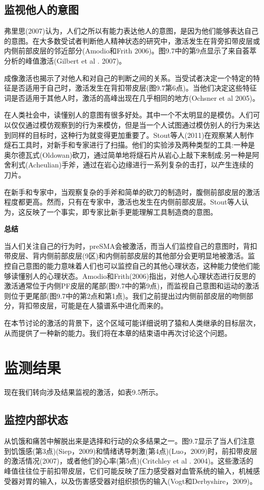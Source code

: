 \subsection{监视他人的意图}
\par
弗里思(2007)认为，人们之所以有能力表达他人的意图，是因为他们能够表达自己的意图。在大多数受试者判断他人精神状态的研究中，激活发生在背旁扣带皮层或内侧前部皮层的邻近部分(Amodio和Frith 2006)。图9.7中的第9点显示了来自荟萃分析的峰值激活(Gilbert et al . 2007)。
\par
成像激活也揭示了对他人和对自己的判断之间的关系。当受试者决定一个特定的特征是否适用于自己时，激活发生在背扣带皮层(图9.7第6点)。当他们决定这些特征词是否适用于其他人时，激活的高峰出现在几乎相同的地方(Ochsner et al 2005)。
\par
在人类社会中，读懂别人的意图有很多好处。其中一个不太明显的是模仿。人们可以仅仅通过模仿观察到的行为来模仿，但是当一个人试图通过模仿别人的行为来达到同样的目标时，这种行为就变得更加重要了。Stout等人(2011)在观察某人制作燧石工具时，对新手和专家进行了扫描。他们的实验涉及两种类型的工具:一种是奥尔德瓦式(Oldowan)砍刀，通过简单地将燧石片从岩心上敲下来制成;另一种是阿舍利式(Acheulian)手斧，通过在岩心边缘进行一系列复杂的击打，以产生连续的刀片。
\par
在新手和专家中，当观察复杂的手斧和简单的砍刀的制造时，腹侧前部皮层的激活程度都更高。然而，只有在专家中，激活也发生在内侧前部皮层。Stout等人认为，这反映了一个事实，即专家比新手更能理解工具制造商的意图。
\par
\textbf{总结}
\par
当人们关注自己的行为时，preSMA会被激活，而当人们监控自己的意图时，背扣带皮层、背内侧前部皮层(9区)和内侧前部皮层的其他部分会更明显地被激活。监控自己意图的能力意味着人们也可以监控自己的其他心理状态，这种能力使他们能够读懂别人的心理状态。Amodio和Frith(2006)指出，对他人心理状态进行反思的激活通常位于内侧PF皮层的尾部(图9.7中的第9点)，而监视自己意图和运动的激活则位于更尾部(图9.7中的第2点和第1点)。我们之前提出过内侧前部皮层的吻侧部分，背扣带皮层，可能是在人猿谱系中进化而来的。
\par
在本节讨论的激活的背景下，这个区域可能详细说明了猿和人类继承的目标层次，从而提供了一种新的能力。我们将在本章的结束语中再次讨论这个问题。
\section{监测结果}
\par
现在我们转向涉及结果监视的激活，如表9.5所示。
\subsection{监控内部状态}
\par
从饥饿和痛苦中解脱出来是选择和行动的众多结果之一。图9.7显示了当人们注意到饥饿感(第3点)(Siep，2009)和情绪诱导刺激(第4点)(Luo，2009)时，前扣带皮层的激活情况(2007)，或者他们的心率(第5点)(Critchley et al . 2004)。这些激活的峰值往往位于前扣带皮层，它们可能反映了压力感受器对血管系统的输入，机械感受器对胃的输入，以及伤害感受器对组织损伤的输入(Vogt和Derbyshire，2009)。
\par

